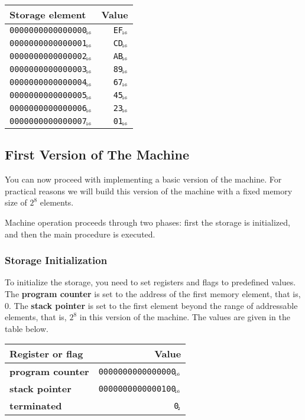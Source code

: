 \documentclass[a4paper,12pt]{article}
\newcommand{\num}[1]{\texttt{#1}\xspace}
\newcommand{\hex}[1]{\num{#1}$_{\textup{\tiny\hskip-1ex 16}}$\xspace}
\newcommand{\bin}[1]{\num{#1}$_{\textup{\tiny\hskip-1ex 2}}$\xspace}
\newcommand{\PC}{\textbf{program counter}\xspace}
\newcommand{\SP}{\textbf{stack pointer}\xspace}
\newcommand{\TERM}{\textbf{terminated}\xspace}
\newcommand{\F}{\bin{0}\xspace}
\begin{document}
\begin{center}
  \begin{tabular}{@{}lr@{}}
    \hline
    Storage element        & Value    \\
    \hline
    \hex{0000000000000000} & \hex{EF} \\
    \hex{0000000000000001} & \hex{CD} \\
    \hex{0000000000000002} & \hex{AB} \\
    \hex{0000000000000003} & \hex{89} \\
    \hex{0000000000000004} & \hex{67} \\
    \hex{0000000000000005} & \hex{45} \\
    \hex{0000000000000006} & \hex{23} \\
    \hex{0000000000000007} & \hex{01} \\
    \hline
  \end{tabular}
\end{center}


\subsection{First Version of The Machine}

You can now proceed with implementing a basic version of the machine.
For practical reasons we will build this version of the machine with a fixed memory size of $2^{8}$ elements.

Machine operation proceeds through two phases: first the storage is initialized, and then the main procedure is executed.

\subsubsection{Storage Initialization}

To initialize the storage, you need to set registers and flags to predefined values.
The \PC is set to the address of the first memory element, that is, $0$.
The \SP is set to the first element beyond the range of addressable elements, that is, $2^{8}$ in this version of the machine.
The values are given in the table below.

\begin{center}
  \begin{tabular}{@{}lr@{}}
    \hline
    Register or flag & Value                   \\
    \hline
    \PC              & \hex{0000000000000000}  \\
    \SP              & \hex{0000000000000100}  \\
    \TERM            & \F                      \\
    \hline
  \end{tabular}
\end{center}
\end{document}
